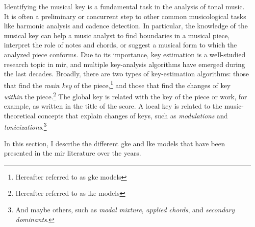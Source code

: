 

Identifying the musical key is a fundamental task in the
analysis of tonal music. It is often a preliminary or
concurrent step to other common musicological tasks like
harmonic analysis and cadence detection. In particular, the
knowledge of the musical key can help a music analyst to
find boundaries in a musical piece, interpret the role of
notes and chords, or suggest a musical form to which the
analyzed piece conforms. Due to its importance, key
estimation is a well-studied research topic in \gls{mir},
and multiple key-analysis algorithms have emerged during the
last decades. Broadly, there are two types of key-estimation
algorithms: those that find the \emph{main key} of the
piece,\footnote{Hereafter referred to as \gls{gke} models}
and those that find the changes of key \emph{within} the
piece.\footnote{Hereafter referred to as \gls{lke} models}
The global key is related with the key of the piece or work,
for example, as written in the title of the score.
A local key is related to the music-theoretical concepts
that explain changes of keys, such as \emph{modulations} and
\emph{tonicizations}.\footnote{And maybe others, such as
\emph{modal mixture}, \emph{applied chords}, and
\emph{secondary dominants}.}

In this section, I describe the different \gls{gke} and
\gls{lke} models that have been presented in the \gls{mir}
literature over the years.
